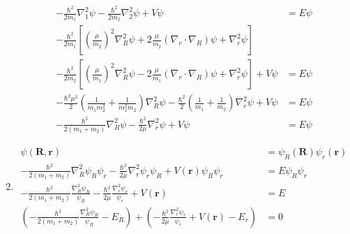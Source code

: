 \documentclass{article}
\renewcommand{\vec}[1]{\boldsymbol{\mathbf{#1}}}
\begin{document}
\begin{enumerate}
        \begin{align*}
          -\frac{\hbar^2}{2 m_1} \nabla_1^2 \psi - \frac{\hbar^2}{2 m_2} \nabla_2^2 \psi + V \psi                                                                                                     & = E \psi \\
          -\frac{\hbar^2}{2 m_1} \left[ \left( \frac{\mu}{m_2} \right)^2 \nabla_R^2 \psi + 2 \frac{\mu}{m_2} (\nabla_r \cdot \nabla_R) \psi + \nabla_r^2 \psi \right]                                 &          \\
          -\frac{\hbar^2}{2 m_2} \left[ \left( \frac{\mu}{m_1} \right)^2 \nabla_R^2 \psi - 2 \frac{\mu}{m_1} (\nabla_r \cdot \nabla_R) \psi + \nabla_r^2 \psi \right] + V \psi                        & = E \psi \\
          -\frac{\hbar^2 \mu^2}{2} \left( \frac{1}{m_1 m_2^2} + \frac{1}{m_1^2 m_2} \right) \nabla_R^2 \psi - \frac{\hbar^2}{2} \left( \frac{1}{m_1} + \frac{1}{m_2} \right) \nabla_r^2 \psi + V \psi & = E \psi \\
          -\frac{\hbar^2}{2 (m_1 + m_2)} \nabla_R^2 \psi - \frac{\hbar^2}{2 \mu} \nabla_r^2 \psi + V \psi                                                                                             & = E \psi
        \end{align*}

  \item

        \begin{align*}
          \psi(\vec{R}, \vec{r})                                                                                                                                                          & = \psi_R(\vec{R}) \psi_r(\vec{r}) \\
          -\frac{\hbar^2}{2 (m_1 + m_2)} \nabla_R^2 \psi_R \psi_r - \frac{\hbar^2}{2 \mu} \nabla_r^2 \psi_r \psi_R + V(\vec{r}) \psi_R \psi_r                                             & = E \psi_R \psi_r                 \\
          -\frac{\hbar^2}{2 (m_1 + m_2)} \frac{\nabla_R^2 \psi_R}{\psi_R} - \frac{\hbar^2}{2 \mu} \frac{\nabla_r^2 \psi_r}{\psi_r} + V(\vec{r})                                           & = E                               \\
          \left( -\frac{\hbar^2}{2 (m_1 + m_2)} \frac{\nabla_R^2 \psi_R}{\psi_R} - E_R \right) + \left(-\frac{\hbar^2}{2 \mu} \frac{\nabla_r^2 \psi_r}{\psi_r} + V(\vec{r}) - E_r \right) & = 0
        \end{align*}
\end{enumerate}
\end{document}
